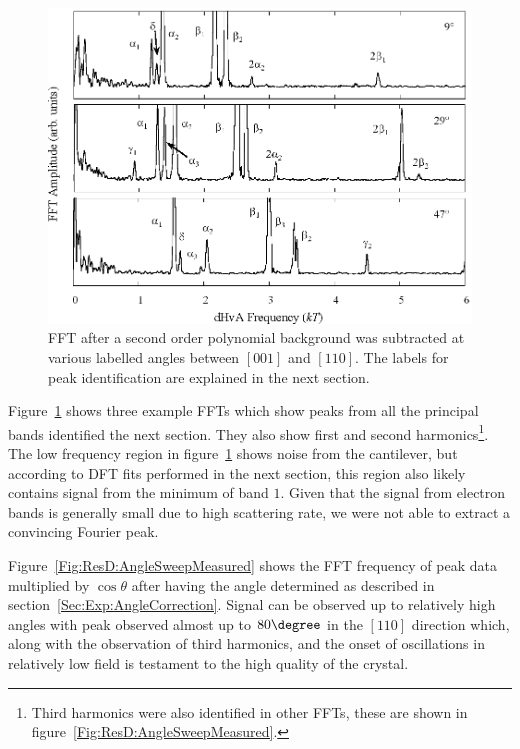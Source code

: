 \begin{figure}[htbp]
    \begin{center}
        \includegraphics[scale=0.9]{Chapter-dHvABaFe2P2/Figures/AngleDepMeasurements/FFTExamples/FFTExamples}
        \caption{\ac{FFT} after a second order polynomial background was subtracted at various labelled angles between $[001]$ and $[110]$. The labels for peak identification are explained in the next section.}
        \label{Fig:ResD:FFTExamples}
    \end{center}
\end{figure}

Figure~\ref{Fig:ResD:FFTExamples} shows three example \acp{FFT} which show peaks from all the principal bands identified the next section. They also show first and second harmonics\footnote{Third harmonics were also identified in other \acp{FFT}, these are shown in figure~\ref{Fig:ResD:AngleSweepMeasured}.}. The low frequency region in figure~\ref{Fig:ResD:FFTExamples} shows noise from the cantilever, but according to \ac{DFT} fits performed in the next section, this region also likely contains signal from the minimum of band $1$. Given that the signal from electron bands is generally small due to high scattering rate, we were not able to extract a convincing Fourier peak.

Figure~\ref{Fig:ResD:AngleSweepMeasured} shows the \ac{FFT} frequency of peak data multiplied by $\cos\theta$ after having the angle determined as described in section~\ref{Sec:Exp:AngleCorrection}.  Signal can be observed up to relatively high angles with peak observed almost up to $80\degree$ in the $[110]$ direction which, along with the observation of third harmonics, and the onset of oscillations in relatively low field is testament to the high quality of the crystal.

